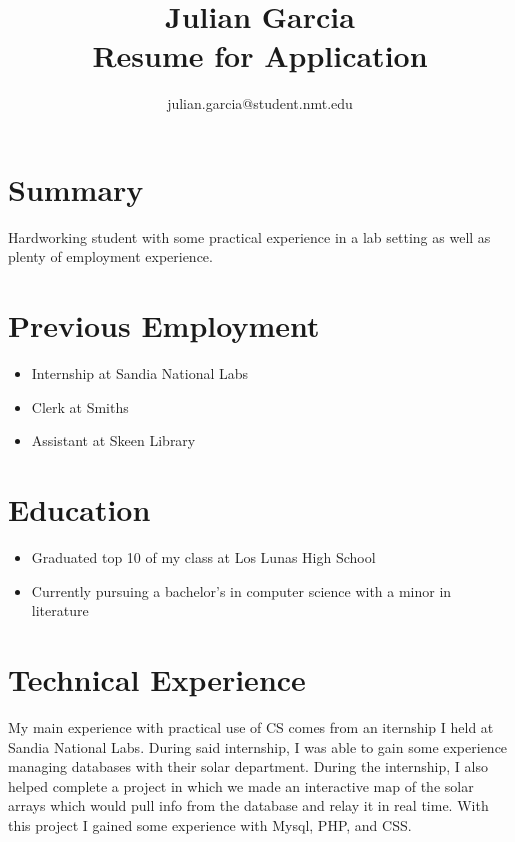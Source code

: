 \documentclass{article}
\title{\LARGE \bf
Julian Garcia\\
\large Resume for Application
}
\author{julian.garcia@student.nmt.edu}
\date{}
\begin{document}
\maketitle
\thispagestyle{empty}
\pagestyle{empty}


\section{Summary}

Hardworking student with some practical experience in a lab setting as well as plenty of employment experience.

\section{Previous Employment}

\begin{itemize}

 \item{Internship at Sandia National Labs}

 \item{Clerk at Smiths}

 \item{Assistant at Skeen Library}


\end{itemize}

\section{Education}

\begin{itemize}

 \item{Graduated top 10 of my class at Los Lunas High School}

 \item{Currently pursuing a bachelor's in computer science with a minor in literature}

\end{itemize}
\section{Technical Experience}


My main experience with practical use of CS comes from an iternship I held at Sandia National Labs. During said internship, I was able to gain some experience managing databases with their solar department. During the internship, I also helped complete a project in which we made an interactive map of the solar arrays which would pull info from the database and relay it in real time. With this project I gained some experience with Mysql, PHP, and CSS.
\end{document}
